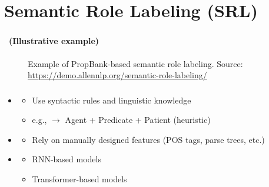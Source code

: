\documentclass[xcolor=table]{beamer}
\begin{document}
\section{Semantic Role Labeling (SRL)}

\begin{frame}
	\frametitle{\insertshortsubtitle}
	\framesubtitle{\insertsection\ (Illustrative example)}

	\begin{figure}
		\caption{Example of PropBank-based semantic role labeling. 
			Source: \url{https://demo.allennlp.org/semantic-role-labeling/}}
	\end{figure}
	
\end{frame}

\begin{frame}
	\frametitle{\insertshortsubtitle}
	\framesubtitle{\insertsection}
	
	\begin{itemize}
		\item {}
		\begin{itemize}
			\item Use syntactic rules and linguistic knowledge
			\item e.g.,  
			$\rightarrow$ Agent + Predicate + Patient (heuristic)
		\end{itemize}
		
		\item {}
		\begin{itemize}
			\item Rely on manually designed features (POS tags, parse trees, etc.)
		\end{itemize}
		
		\item {}
		\begin{itemize}
			\item RNN-based models
			\item Transformer-based models
		\end{itemize}
	\end{itemize}
	
\end{frame}
\end{document}
